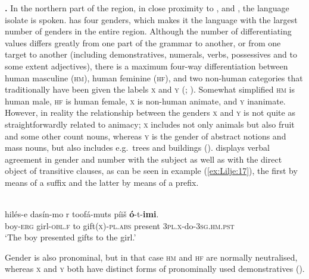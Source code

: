 \documentclass[output=collectionpaper]{langsci/langscibook}
\begin{document}
\textbf{.} In the northern part of the region, in close proximity to  ,   and  , the language isolate  is spoken.  has four genders, which makes it the language with the largest number of genders in the entire region. Although the number of differentiating values differs greatly from one part of the grammar  to another, or from one target to another (including demonstratives, numerals, verbs, possessives and to some extent adjectives), there is a maximum four-way differentiation between human masculine (\textsc{hm}), human feminine (\textsc{hf}), and two non-human categories that traditionally have been given the labels \textsc{x} and \textsc{y} (\citealt[8--9]{Willson1996}; \citealt[33--34]{Berger1998}). Somewhat simplified \textsc{hm} is human male, \textsc{hf} is human female, \textsc{x} is non-human animate, and \textsc{y} inanimate. However, in reality the relationship between the genders \textsc{x} and \textsc{y} is not quite as straightforwardly related to animacy; \textsc{x} includes not only animals but also fruit and some other count nouns, whereas \textsc{y} is the gender of abstract notions and mass nouns, but also includes e.g.\ trees and buildings (\citealt[32--33]{Yoshioka2012}).  displays verbal agreement in gender and number with the subject as well as with the direct object of transitive clauses, as can be seen in example (\ref{ex:Lilje:17}), the first by means of a suffix and the latter by means of a prefix.

\ea
\label{ex:Lilje:17}
 \citep[17]{Willson1996}\\
\gll hilés-e dasín-mo r toofá-muts píiš \textbf{ó}{}-t-\textbf{imi}.   \\
boy-\textsc{erg} girl-\textsc{obl.f} to gift\textsc{(x)-pl.abs} present \textsc{3pl.x}{}-do-\textsc{3sg.hm.pst}   \\
\glt `The boy presented gifts to the girl.'
\z

Gender is also pronominal, but in that case \textsc{hm} and \textsc{hf} are normally neutralised, whereas \textsc{x} and \textsc{y} both have distinct forms of pronominally used demonstratives (\citealt[81--82]{Berger1998}).
\end{document}

